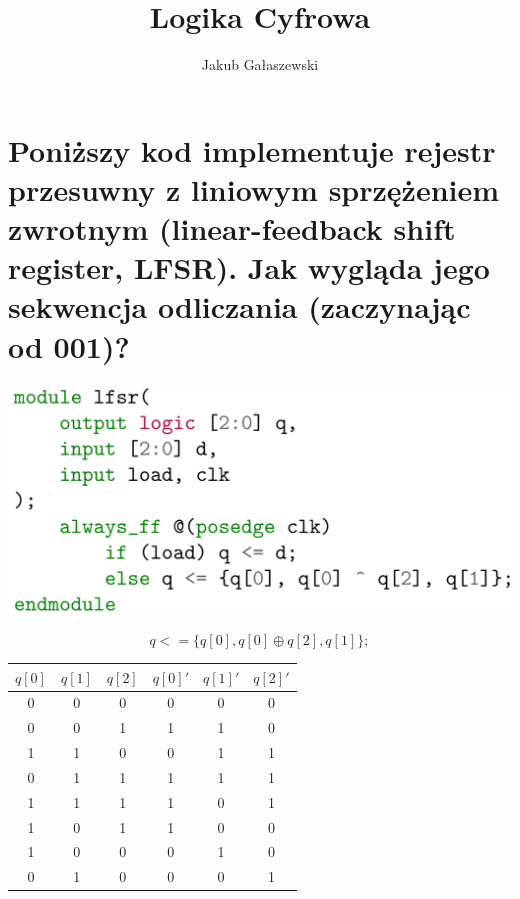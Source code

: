 \documentclass{article}
\title{Logika Cyfrowa}
\author{Jakub Gałaszewski}
\begin{document}
\maketitle
\section{Poniższy kod implementuje rejestr przesuwny z liniowym sprzężeniem zwrotnym (linear-feedback shift register, LFSR). Jak wygląda jego sekwencja odliczania (zaczynając od 001)?}
\begin{center}
\includegraphics[scale=0.2]{./L08Z01.png}
\end{center}
\begin{center}
	$$q <= \{q[0], q[0] \oplus q[2], q[1]\};$$
	\begin{tabular}{|c|c|c||c|c|c|} 
	 \hline
	$q[0]$ & $q[1]$ & $q[2]$ & $q[0]'$ & $q[1]'$ & $q[2]'$ \\ 
	 \hline \hline
	 0&0&0&0&0&0\\ \hline
	 0&0&1& 1&1&0\\ \hline
	 1&1&0& 0&1&1\\ \hline
	 0&1&1& 1&1&1\\ \hline
	 1&1&1& 1&0&1\\ \hline	 
	 1&0&1& 1&0&0\\ \hline
	 1&0&0& 0&1&0\\ \hline
	 0&1&0& 0&0&1\\ \hline
	\end{tabular}
\end{center}
\end{document}
